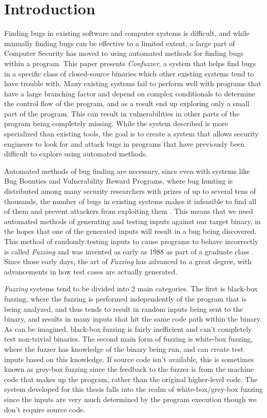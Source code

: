 \chapter{Introduction}
Finding bugs in existing software and computer systems is difficult, and while
manually finding bugs can be effective to a limited extent, a large part of
Computer Security has moved to using automated methods for finding bugs within a
program. This paper presents \textit{Confuzzer}, a system that helps find bugs
in a specific class of closed-source binaries which other existing systems tend
to have trouble with. Many existing systems fail to perform well with programs
that have a large branching factor and depend on complex conditionals to
determine the control flow of the program, and as a result end up exploring only
a small part of the program. This can result in vulnerabilities in other parts
of the program being completely missing. While the system described is more
specialized than existing tools, the goal is to create a system that allows
security engineers to look for and attack bugs in programs that have previously
been difficult to explore using automated methods. 

Automated methods of bug finding are necessary, since even with systems like Bug
Bounties and Vulnerability Reward Programs, where bug hunting is distributed
among many security researchers with prizes of up to several tens of thousands,
the number of bugs in existing systems makes it infeasible to find all of them
and prevent attackers from exploiting them \cite{googlevrp}. This means that we
need automated methods of generating and testing inputs against our target
binary, in the hopes that one of the generated inputs will result in a bug being
discovered. This method of randomly testing inputs to cause programs to behave
incorrectly is called \textit{Fuzzing} and was invented as early as 1988 as part
of a graduate class \cite{fuzzingorigin}. Since those early days, the art of
\textit{Fuzzing} has advanced to a great degree, with advancements in how test
cases are actually generated.

\textit{Fuzzing} systems tend to be divided into 2 main categories. The first is
black-box fuzzing, where the fuzzing is performed independently of the program
that is being analyzed, and thus tends to result in random inputs being sent to
the binary, and results in many inputs that hit the same code path within the
binary. As can be imagined, black-box fuzzing is fairly inefficient and can't
completely test non-trivial binaries. The second main form of fuzzing is
white-box fuzzing, where the fuzzer has knowledge of the binary being run, and
can create test inputs based on this knowledge. If source code isn't available,
this is sometimes known as grey-box fuzzing since the feedback to the fuzzer is
from the machine code that makes up the program, rather than the original
higher-level code. The system developed for this thesis falls into the realm of
white-box/grey-box fuzzing since the inputs are very much determined by the
program execution though we don't require source code.

